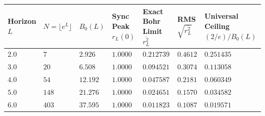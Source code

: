 \documentclass[
  11pt,
]{article}
\newcounter{none} %
\begin{document}
\begin{enumerate}
  {\def\LTcaptype{none} %
  \begin{longtable}[]{@{}
    >{\centering\arraybackslash}p{}
    >{\centering\arraybackslash}p{}
    >{\centering\arraybackslash}p{}
    >{\centering\arraybackslash}p{}
    >{\centering\arraybackslash}p{}
    >{\centering\arraybackslash}p{}
    >{\centering\arraybackslash}p{}@{}}
  \toprule\noalign{}
  \begin{minipage}[b]{\linewidth}\centering
  Horizon \(L\)
  \end{minipage} & \begin{minipage}[b]{\linewidth}\centering
  \(N = \lfloor e^L \rfloor\)
  \end{minipage} & \begin{minipage}[b]{\linewidth}\centering
  \(B_0(L)\)
  \end{minipage} & \begin{minipage}[b]{\linewidth}\centering
  Sync Peak \(r_L(0)\)
  \end{minipage} & \begin{minipage}[b]{\linewidth}\centering
  Exact Bohr Limit \(\overline{r_L^2}\)
  \end{minipage} & \begin{minipage}[b]{\linewidth}\centering
  RMS \(\sqrt{\overline{r_L^2}}\)
  \end{minipage} & \begin{minipage}[b]{\linewidth}\centering
  Universal Ceiling \((2/e)/B_0(L)\)
  \end{minipage} \\
  \midrule\noalign{}
  \endhead
  \bottomrule\noalign{}
  \endlastfoot
  \(2.0\) & \(7\) & \(2.926\) & \(1.0000\) & \(0.212739\) & \(0.4612\) &
  \(0.251435\) \\
  \(3.0\) & \(20\) & \(6.508\) & \(1.0000\) & \(0.094521\) & \(0.3074\)
  & \(0.113058\) \\
  \(4.0\) & \(54\) & \(12.192\) & \(1.0000\) & \(0.047587\) & \(0.2181\)
  & \(0.060349\) \\
  \(5.0\) & \(148\) & \(21.276\) & \(1.0000\) & \(0.024651\) &
  \(0.1570\) & \(0.034582\) \\
  \textbf{\(6.0\)} & \textbf{\(403\)} & \textbf{\(37.595\)} &
  \textbf{\(1.0000\)} & \textbf{\(0.011823\)} & \textbf{\(0.1087\)} &
  \textbf{\(0.019571\)} \\
  \end{longtable}
  }


\end{enumerate}
\end{document}

